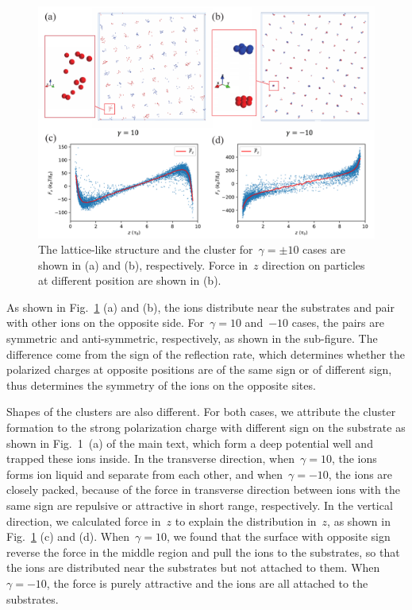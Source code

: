 \documentclass[aps,prl,reprint,showpacs,floatfix,superscriptaddress, onecolumn]{revtex4-2}
\begin{document}
\begin{figure}[htbp]
    \centering
    \includegraphics[width = \linewidth]{SIfig/MD_ball.pdf}
    \caption{The lattice-like structure and the cluster for~$\gamma = \pm 10$ cases are shown in (a) and (b), respectively. Force in~$z$ direction on particles at different position are shown in (b).}
    \label{fig:balls}
\end{figure}

As shown in Fig.~\ref{fig:balls} (a) and (b), the ions distribute near the substrates and pair with other ions on the opposite side.
For~$\gamma = 10$ and~$-10$ cases, the pairs are symmetric and anti-symmetric, respectively, as shown in the sub-figure.
The difference come from the sign of the reflection rate, which determines whether the polarized charges at opposite positions are of the same sign or of different sign, thus determines the symmetry of the ions on the opposite sites.

Shapes of the clusters are also different.
For both cases, we attribute the cluster formation to the strong polarization charge with different sign on the substrate as shown in Fig.~1~(a) of the main text, which form a deep potential well and trapped these ions inside.
In the transverse direction, when~$\gamma = 10$, the ions forms ion liquid and separate from each other, and when~$\gamma = -10$, the ions are closely packed, because of the force in transverse direction between ions with the same sign are repulsive or attractive in short range, respectively.
In the vertical direction, we calculated force in~$z$ to explain the distribution in~$z$, as shown in Fig.~\ref{fig:balls} (c) and (d).
When~$\gamma = 10$, we found that the surface with opposite sign reverse the force in the middle region and pull the ions to the substrates, so that the ions are distributed near the substrates but not attached to them.
When~$\gamma = -10$, the force is purely attractive and the ions are all attached to the substrates.
\end{document}
